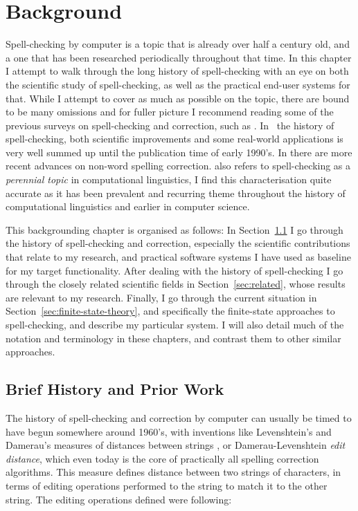 \documentclass[officiallayout]{unihelcompling}
\begin{document}
\chapter{Background}
\label{chap:background}

Spell-checking by computer is a topic that is already over half a century old,
and a one that has been researched periodically throughout that time.  In this
chapter I attempt to walk through the long history of spell-checking with an
eye on both the scientific study of spell-checking, as well as the practical
end-user systems for that. While I attempt to cover as much as possible on the
topic, there are bound to be many omissions and for fuller picture I recommend
reading some of the previous surveys on spell-checking and correction, such as
\citet{kukich1992spelling,mitton2009ordering}.  In~\citet{kukich1992spelling}
the history of spell-checking, both scientific improvements and some real-world
applications is very well summed up until the publication time of early 1990's.
In \citet{mitton2009ordering} there are more recent advances on non-word
spelling correction.  \citet{kukich1992spelling} also refers to spell-checking
as a \emph{perennial topic} in computational linguistics, I find this
characterisation quite accurate as it has been prevalent and recurring theme
throughout the history of computational linguistics and earlier in
computer science.

This backgrounding chapter is organised as follows: In
Section~\ref{sec:history} I go through the history of spell-checking and
correction, especially the scientific contributions that relate to my research,
and practical software systems I have used as baseline for my target
functionality.  After dealing with the history of spell-checking I go through
the closely related scientific fields in Section~\ref{sec:related}, whose
results are relevant to my research. Finally, I go through the current
situation in Section~\ref{sec:finite-state-theory}, and specifically the
finite-state approaches to spell-checking, and describe my particular system. I
will also detail much of the notation and terminology in these chapters, and
contrast them to other similar approaches.

\section{Brief History and Prior Work}
\label{sec:history}

The history of spell-checking and correction by computer can usually be timed
to have begun somewhere around 1960's, with inventions like Levenshtein's and
Damerau's measures of distances between strings
\citep{levenshtein1966binary,damerau1964technique}, or Damerau-Levenshtein
\emph{edit distance}, which even today is the core of practically all spelling
correction algorithms. This measure defines distance between two strings of
characters, in terms of editing operations performed to the string to match it
to the other string. The editing operations defined were following:
\end{document}
